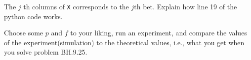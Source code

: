 \documentclass[assignments]{subfiles}
\begin{document}
\begin{exercise}
The $j$ th columns of \texttt{X} corresponds to the $j$th bet. Explain how line 19 of the python code works.
\begin{solution}
\end{solution}
\end{exercise}

\begin{exercise}
Choose some $p$ and $f$ to your liking, run an experiment, and compare the values of the experiment(simulation) to the theoretical values, i.e., what you get when you solve  problem BH.9.25.
\begin{solution}
\end{solution}
\end{exercise}
\end{document}
